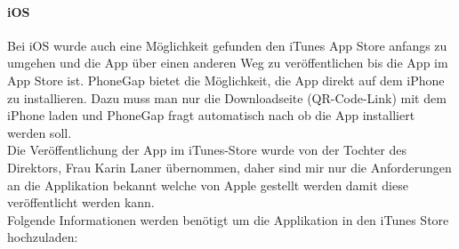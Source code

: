 \paragraph{iOS\\}

Bei iOS wurde auch eine Möglichkeit gefunden den iTunes App Store anfangs zu umgehen und die App über einen anderen Weg zu veröffentlichen bis die App im App Store ist. PhoneGap bietet die Möglichkeit, die App direkt auf dem iPhone zu installieren. Dazu muss man nur die Downloadseite (QR-Code-Link) mit dem iPhone laden und PhoneGap fragt automatisch nach ob die App installiert werden soll.\\
Die Veröffentlichung der App im iTunes-Store wurde von der Tochter des Direktors, Frau Karin Laner übernommen, daher sind mir nur die Anforderungen an die Applikation bekannt welche von Apple gestellt werden damit diese veröffentlicht werden kann.\\
Folgende Informationen werden benötigt um die Applikation in den iTunes Store hochzuladen:\\

